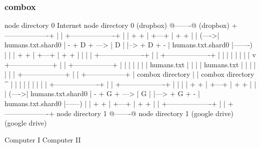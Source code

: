 \begin{frame}[fragile]
  \frametitle{combox}

  {\tiny
  \begin{semiverbatim}

         node directory 0                Internet              node directory 0
         (dropbox)                       @-------@             (dropbox)
        +-------------------+            |       |            +-------------------+
        |                   |    + +     | +---+ |     + +    |                   |
  (---->| humans.txt.shard0 | - + D + ---> | D | |--> + D + - | humans.txt.shard0 |-------)
  |     |                   |    + +     | +---+ |     + +    |                   |       |
  |     +-------------------+            |       |            +-------------------+       |
  |                                      |       |                                        |
  |                                      |       |                                        v
 +------------------+                    |       |                        +-----------------+
 |                  |                    |       |                        |                 |
 |  humans.txt      |                    |       |                        | humans.txt      |
 |                  |                    |       |                        |                 |
 +------------------+                    |       |                        +-----------------+
  |  combox directory                    |       |                      combox directory  ^
  |                                      |       |                                        |
  |                                      |       |                                        |
  |     +-------------------+            |       |             +-------------------+      |
  |     |                   |    + +     | +---+ |      + +    |                   |      |
  (---->| humans.txt.shard0 | - + G + ---> | G | |---> + G + - | humans.txt.shard0 |------)
        |                   |    + +     | +---+ |      + +    |                   |
        +-------------------+            |       |             +-------------------+
         node directory 1                @-------@              node directory 1
         (google drive)                                         (google drive)

  Computer I                                                                    Computer II
  \end{semiverbatim}
  }

\end{frame}